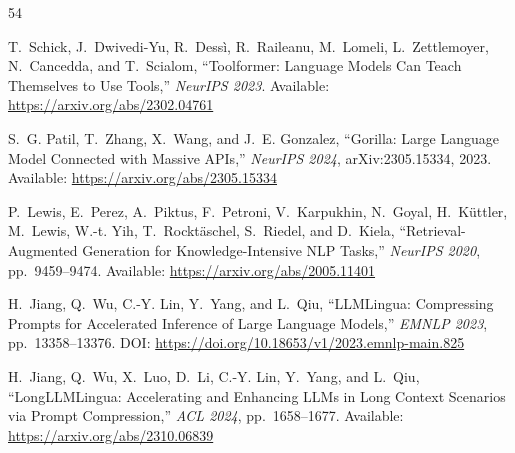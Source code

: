 \documentclass[acmlarge,nonacm,screen]{acmart}
\begin{document}
\begin{thebibliography}{54}

T.~Schick, J.~Dwivedi-Yu, R.~Dess\`{i}, R.~Raileanu, M.~Lomeli, L.~Zettlemoyer, N.~Cancedda, and T.~Scialom,
``Toolformer: Language Models Can Teach Themselves to Use Tools,''
\textit{NeurIPS 2023}.
\newline Available: \url{https://arxiv.org/abs/2302.04761}

S.~G. Patil, T.~Zhang, X.~Wang, and J.~E. Gonzalez,
``Gorilla: Large Language Model Connected with Massive APIs,''
\textit{NeurIPS 2024}, arXiv:2305.15334, 2023.
\newline Available: \url{https://arxiv.org/abs/2305.15334}


P.~Lewis, E.~Perez, A.~Piktus, F.~Petroni, V.~Karpukhin, N.~Goyal, H.~K\"{u}ttler, M.~Lewis, W.-t. Yih, T.~Rockt\"{a}schel, S.~Riedel, and D.~Kiela,
``Retrieval-Augmented Generation for Knowledge-Intensive NLP Tasks,''
\textit{NeurIPS 2020}, pp.~9459--9474.
\newline Available: \url{https://arxiv.org/abs/2005.11401}


H.~Jiang, Q.~Wu, C.-Y. Lin, Y.~Yang, and L.~Qiu,
``LLMLingua: Compressing Prompts for Accelerated Inference of Large Language Models,''
\textit{EMNLP 2023}, pp.~13358--13376.
\newline DOI: \url{https://doi.org/10.18653/v1/2023.emnlp-main.825}

H.~Jiang, Q.~Wu, X.~Luo, D.~Li, C.-Y. Lin, Y.~Yang, and L.~Qiu,
``LongLLMLingua: Accelerating and Enhancing LLMs in Long Context Scenarios via Prompt Compression,''
\textit{ACL 2024}, pp.~1658--1677.
\newline Available: \url{https://arxiv.org/abs/2310.06839}


\end{thebibliography}
\end{document}
